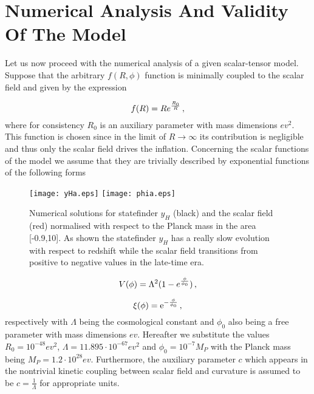 \documentclass[aps,prd,twocolumn,groupedaddress,showpacs,nofootinbib,amssymb]{revtex4-2}
\newcommand\e{\mathrm{e}}
\begin{document}
\section{Numerical Analysis And Validity Of The Model}
Let us now proceed with the numerical analysis of a given scalar-tensor model. Suppose that the arbitrary $f(R,\phi)$ function is minimally coupled to the scalar field and given by the expression

\begin{equation}
\centering
\label{f(R)}
f(R)=R e^{\frac{R_0}{R}}\, ,
\end{equation}
where for consistency $R_0$ is an auxiliary parameter with mass dimensions $ev^{2}$. This function is chosen since in the limit of $R\to\infty$ its contribution is negligible and thus only the scalar field drives the inflation. Concerning the scalar functions of the model we assume that they are trivially described by exponential functions of the following forms

\begin{figure}[h!]
\centering
\label{plot1}
\texttt{[image: yHa.eps]}
\texttt{[image: phia.eps]}
\caption{Numerical solutions for statefinder $y_H$ (black) and the scalar field (red) normalised with respect to the Planck mass in the area [-0.9,10]. As shown the statefinder $y_H$ has a really slow evolution with respect to redshift while the scalar field transitions from positive to negative values in the late-time era.}
\end{figure}

\begin{equation}
\centering
\label{V}
V(\phi)=\Lambda^2(1-e^{\frac{\phi}{\phi_0}})\, ,
\end{equation}

\begin{equation}
\centering
\label{xi}
\xi(\phi)=\e^{-\frac{\phi}{\phi_0}}\, ,
\end{equation}  
respectively with $\Lambda$ being the cosmological constant and $\phi_0$ also being a free parameter with mass dimensions $ev$. Hereafter we substitute the values $R_0=10^{-48}ev^2$,  $\Lambda=11.895\cdot10^{-67}ev^2$ and $\phi_0=10^{-7}M_P$ with the Planck mass being $M_P=1.2\cdot 10^{28}ev$. Furthermore, the auxiliary parameter $c$ which appears in the nontrivial kinetic coupling between scalar field and curvature is assumed to be $c=\frac{1}{\Lambda}$ for appropriate units.
\end{document}
